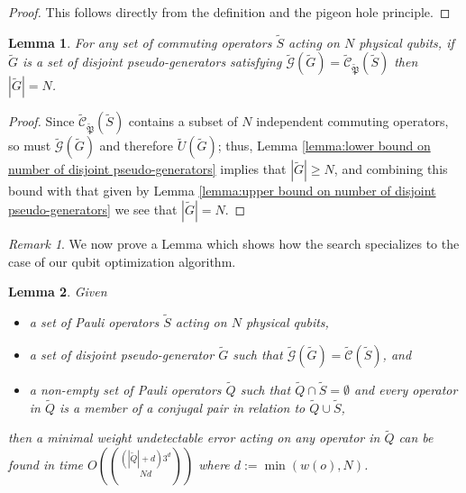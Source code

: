 \documentclass[12pt]{amsbook}
\theoremstyle{plain}
\newtheorem{lemma}{Lemma}
\theoremstyle{definition}
\theoremstyle{remark}
\newtheorem{remark}{Remark}
\newcommand{\set}{\tilde}
\newcommand{\genfun}{\tilde{\mathcal{G}}}
\newcommand{\pauligroup}{{\set{\mathfrak{P}}}}
\newcommand{\centralizer}{\set{\mathcal{C}}}
\newcommand{\paren}[1]{\left(#1\right)}
\begin{document}
\begin{proof}
This follows directly from the definition and the pigeon hole principle.
\end{proof}

\begin{lemma}
\label{lemma:exact bound on number of disjoint pseudo-generators}
For any set of commuting operators $\set S$ acting on $N$ physical qubits, if $\set G$ is a set of disjoint pseudo-generators satisfying $\genfun(\set G)=\centralizer_\pauligroup(\set S)$ then $|\set G|= N$.
\end{lemma}

\begin{proof}
Since $\centralizer_\pauligroup(\set S)$ contains a subset of $N$ independent commuting operators, so must $\genfun(\set G)$ and therefore $\set U(\set G)$;  thus, Lemma \ref{lemma:lower bound on number of disjoint pseudo-generators} implies that $|\set G|\ge N$, and combining this bound with that given by Lemma \ref{lemma:upper bound on number of disjoint pseudo-generators} we see that $|\set G|=N$.
\end{proof}
\begin{remark}
We now prove a Lemma which shows how the search specializes to the case of our qubit optimization algorithm.
\end{remark}

\begin{lemma}
\label{lemma:search for minimal weight undetectable error}
Given
\begin{itemize}
\item a set of Pauli operators $\set S$ acting on $N$ physical qubits,
\item a set of disjoint pseudo-generator $\set G$ such that $\genfun(\set G)=\centralizer(\set S)$, and
\item a non-empty set of Pauli operators $\set Q$ such that $\set Q\cap\set S=\emptyset$ and every operator in $\set Q$ is a member of a conjugal pair in relation to $\set Q \cup \set S$,
\end{itemize}
then a minimal weight undetectable error acting on any operator in $\set Q$ can be found in time $O\paren{(|\set Q|+d)3^d\choose{N}{d}}$ where $d:=\min\paren{w(o),N}$.
\end{lemma}
\end{document}
